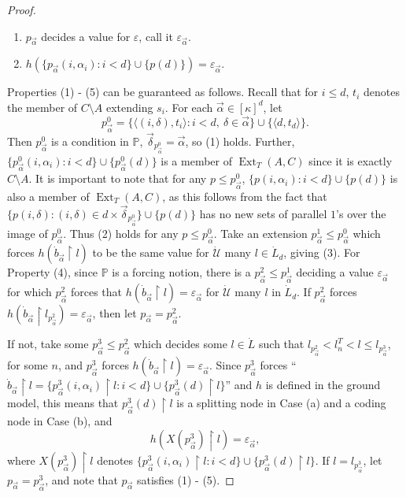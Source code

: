\documentclass{amsart}
\theoremstyle{remark}
\theoremstyle{definition}
\theoremstyle{remark}
\newcommand{\al}{\alpha}
\DeclareMathOperator{\Ext}{Ext}
\newcommand{\re}{\restriction}
\newcommand{\bP}{\mathbb{P}}
\newcommand{\lgl}{\langle}
\newcommand{\rgl}{\rangle}
\begin{document}
\begin{proof}
\begin{enumerate}
\item
$p_{\vec{\al}}$ decides a value for $\varepsilon$, call it  $\varepsilon_{\vec{\al}}$.
\item
$h(\{p_{\vec\al}(i,\al_i):i< d\}\cup\{p(d)\})=\varepsilon_{\vec{\al}}$.
\end{enumerate}




Properties (1) -  (5) can be guaranteed  as follows.
Recall that for $i\le d$, $t_i$ denotes the member of $C\setminus A$ extending $s_i$.
For each  $\vec{\al}\in[\kappa]^d$, let
$$
p^0_{\vec{\al}}=\{\lgl (i,\delta), t_i\rgl: i< d, \ \delta\in\vec{\al} \}\cup\{\lgl d,t_d\rgl\}.
$$
Then $p^0_{\vec{\al}}$ is a condition in $\bP$,
$\vec\delta_{p_{\vec\al}^0}= \vec\al$, so (1) holds.
Further,
$\{p^0_{\vec\al}(i,\al_i):i<d\}\cup\{p^0_{\vec{\al}}(d)\}$ is a member of $\Ext_T(A,C)$ since it is exactly $C\setminus A$.
It is important to note that
for any $p\le p_{\vec\al}^0$,
 $\{p(i,\al_i):i< d\}\cup\{p(d)\}$
is also  a member of $\Ext_T(A,C)$,
as this follows from the fact that
$\{p(i,\delta):(i,\delta)\in d\times \vec{\delta}_{p_{\vec\al}^0}\}\cup\{p(d)\}$ has no new sets of parallel $1$'s over the image of $p_{\vec\al}^0$.
Thus (2) holds for any $p\le p_{\vec\al}^0$.
Take  an extension $p^1_{\vec{\al}}\le p^0_{\vec{\al}}$ which
forces  $h(\dot{b}_{\vec{\al}}\re l)$ to be the same value for
$\dot{\mathcal{U}}$  many  $l\in \dot{L}_d$, giving (3).
For Property (4),
since $\bP$ is a forcing notion, there is a $p^2_{\vec{\al}}\le p_{\vec{\al}}^1$ deciding a value $\varepsilon_{\vec{\al}}$ for which $p^2_{\vec{\al}}$ forces that $h(\dot{b}_{\vec{\al}}\re l)=\varepsilon_{\vec{\al}}$
for $\dot{\mathcal{U}}$ many $l$ in $\dot{L}_d$.
If $p^2_{\vec\al}$ forces 
$h(\dot{b}_{\vec\al}\re l_{p^2_{\vec\al}})=\varepsilon_{\vec\al}$, then let $p_{\vec\al}=p^2_{\vec\al}$.



If not,
take  some  $p^3_{\vec\al}\le p^2_{\vec\al}$
which decides
some $l\in\dot{L}$
such that
$l_{p^2_{\vec\al}}< l_n^T< l\le l_{p^3_{\vec\al}}$,
 for some $n$,
and  $p^3_{\vec\al}$ forces
$h(\dot{b}_{\vec\al}\re l)=\varepsilon_{\vec\al}$.
Since $p^3_{\vec\al}$ forces ``$\dot{b}_{\vec\al}\re l=
\{p^3_{\vec\al}(i,\al_i)\re l:i<d\}   \cup\{p^3_{\vec\al}(d)\re l\}$'' and $h$ is defined in the ground model,
 this means that  $p^3_{\vec\al}(d)\re l$ is a splitting node in Case (a) and a coding node in Case (b), and
\begin{equation}\label{eq.hrest}
h(X(p^3_{\vec\al})\re l)
=\varepsilon_{\vec\al},
\end{equation}
where
$X(p^3_{\vec\al})\re l$ denotes
$\{p^3_{\vec\al}(i,\al_i)\re l:i<d\}   \cup\{p^3_{\vec\al}(d)\re l\}$.
If $l=l_{p^3_{\vec\al}}$, let $p_{\vec\al}=p_{\vec\al}^3$, and note that $p_{\vec\al}$ satisfies (1) - (5).




\end{proof}
\end{document}
